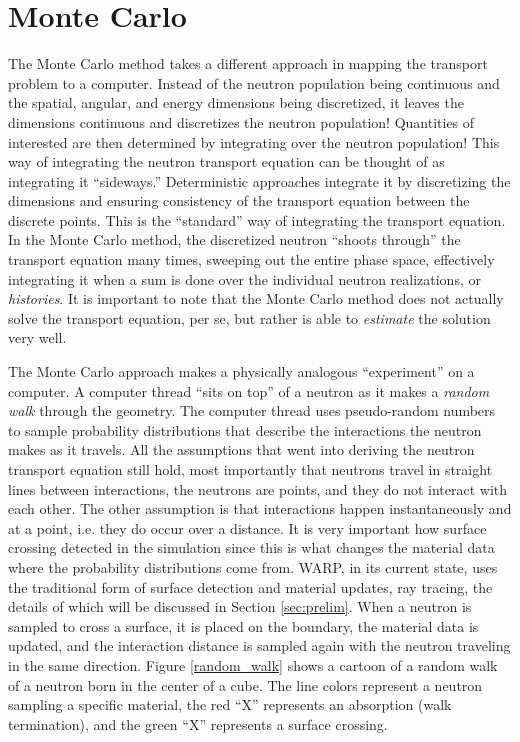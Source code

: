 \section{Monte Carlo}

The Monte Carlo method takes a different approach in mapping the transport problem to a computer.  Instead of the neutron population being continuous and the spatial, angular, and energy dimensions being discretized, it leaves the dimensions continuous and discretizes the neutron population!   Quantities of interested are then determined by integrating over the neutron population!   This way of integrating the neutron transport equation can be thought of as integrating it ``sideways.''   Deterministic approaches integrate it by discretizing the dimensions and ensuring consistency of the transport equation between the discrete points.  This is the ``standard'' way of integrating the transport equation.  In the Monte Carlo method, the discretized neutron ``shoots through'' the transport equation many times, sweeping out the entire phase space, effectively integrating it when a sum is done over the individual neutron realizations, or \emph{histories}.  It is important to note that the Monte Carlo method does not actually solve the transport equation, per se, but rather is able to \emph{estimate} the solution very well.

The Monte Carlo approach makes a physically analogous ``experiment'' on a computer.  A computer thread ``sits on top'' of a neutron as it makes a \emph{random walk} through the geometry.  The computer thread uses pseudo-random numbers to sample probability distributions that describe the interactions the neutron makes as it travels.  All the assumptions that went into deriving the neutron transport equation still hold, most importantly that neutrons travel in straight lines between interactions, the neutrons are points, and they do not interact with each other.  The other assumption is that interactions happen instantaneously and at a point, i.e. they do occur over a distance.  It is very important how surface crossing detected in the simulation since this is what changes the material data where the probability distributions come from.  WARP, in its current state, uses the traditional form of surface detection and material updates, ray tracing, the details of which will be discussed in Section \ref{sec:prelim}.  When a neutron is sampled to cross a surface, it is placed on the boundary, the material data is updated, and the interaction distance is sampled again with the neutron traveling in the same direction.  Figure \ref{random_walk} shows a cartoon of a random walk of a neutron born in the center of a cube.  The line colors represent a neutron sampling a specific material, the red ``X'' represents an absorption (walk termination), and the green ``X'' represents a surface crossing.

